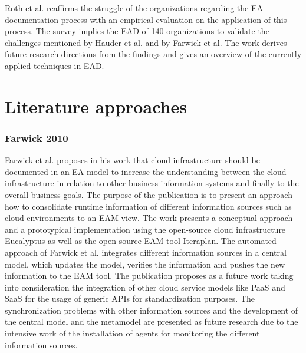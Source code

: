 Roth et al. \cite{Roth2013} reaffirms the struggle of the organizations regarding the EA documentation process with an empirical evaluation on the application of this process. The survey implies the EAD of 140 organizations to validate the challenges mentioned by Hauder et al. \cite{Hauder2012} and by Farwick et al. \cite{Farwick2013} The work derives future research directions from the findings and gives an overview of the currently applied techniques in EAD. 


\section{Literature approaches}

\subsubsection{Farwick 2010}

Farwick et al. \cite{Farwick2010} proposes in his work that cloud infrastructure should be documented in an EA model to increase the understanding between the cloud infrastructure in relation to other business information systems and finally to the overall business goals. The purpose of the publication is to present an approach how to consolidate runtime information of different information sources such as cloud environments to an EAM view. The work presents a conceptual approach and a prototypical implementation using the open-source cloud infrastructure Eucalyptus as well as the open-source EAM tool Iteraplan. The automated approach of Farwick et al. integrates different information sources in a central model, which updates the model, verifies the information and pushes the new information to the EAM tool. The publication proposes as a future work taking into consideration the integration of other cloud service models like PaaS and SaaS for the usage of generic APIs for standardization purposes. The synchronization problems with other information sources and the development of the central model and the metamodel are presented as future research due to the intensive work of the installation of agents for monitoring the different information sources. 

